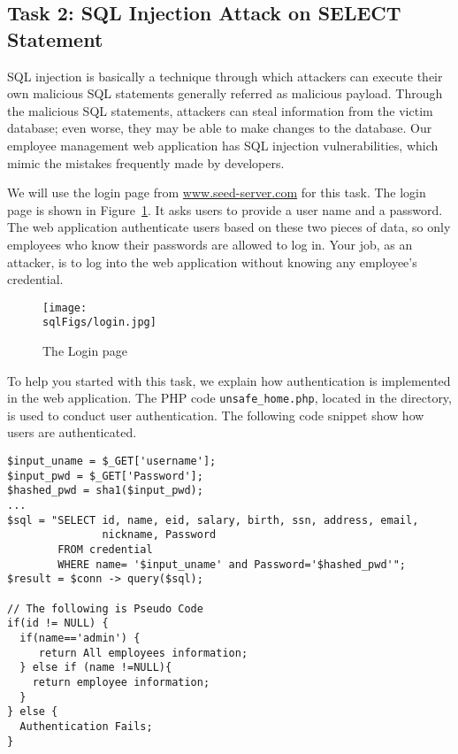 \subsection{Task 2: SQL Injection Attack on SELECT Statement} 


SQL injection is basically a technique through
which attackers can execute their own malicious SQL statements generally
referred as malicious payload. Through the malicious SQL statements, 
attackers can steal information from the victim database; even worse,
they may be able to make changes to the database. Our employee
management web application has SQL injection vulnerabilities, which mimic 
the mistakes frequently made by developers. 

We will use the login page from \url{www.seed-server.com}
for this task. The login page is shown in Figure~\ref{sql:fig:login}. 
It asks users to provide a user name and a password.
The web application authenticate users based on these two pieces 
of data, so only employees who know their 
passwords are allowed to log in.
Your job, as an attacker, is to log into the web application without knowing
any employee's credential. 


\begin{figure}[htb]
\begin{center}
\texttt{[image: \\sqlFigs/login.jpg]}
\end{center}
\caption{The Login page}
\label{sql:fig:login}
\end{figure}
 

To help you started with this task, we explain how authentication
is implemented in the web application. The PHP code 
\texttt{unsafe\_home.php}, located in the  directory, 
is used to conduct user authentication.
The following code snippet show how users are authenticated. 

\begin{lstlisting}
$input_uname = $_GET['username'];
$input_pwd = $_GET['Password'];
$hashed_pwd = sha1($input_pwd);
...
$sql = "SELECT id, name, eid, salary, birth, ssn, address, email, 
               nickname, Password
        FROM credential
        WHERE name= '$input_uname' and Password='$hashed_pwd'";
$result = $conn -> query($sql);

// The following is Pseudo Code 
if(id != NULL) {
  if(name=='admin') {
     return All employees information;
  } else if (name !=NULL){
    return employee information;
  }
} else {
  Authentication Fails;
}
\end{lstlisting}

